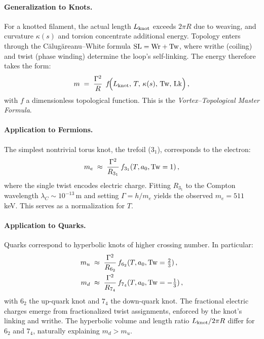 \documentclass[12pt]{article}
\begin{document}
\paragraph{Generalization to Knots.}
For a knotted filament, the actual length $L_{\rm knot}$ exceeds $2\pi R$ due to weaving, and curvature $\kappa(s)$ and torsion concentrate additional energy. Topology enters through the Călugăreanu–White formula ${\rm SL}={\rm Wr}+{\rm Tw}$, where writhe (coiling) and twist (phase winding) determine the loop’s self-linking. The energy therefore takes the form:
\begin{equation}
m \;=\; \frac{\Gamma^2}{R}\;\,f\!\Big(L_{\rm knot},\,T,\,\kappa(s),\,{\rm Tw},\,{\rm Lk}\Big)\,,
\label{eq:master}
\end{equation}
with $f$ a dimensionless topological function. This is the \emph{Vortex–Topological Master Formula}.

\paragraph{Application to Fermions.}
The simplest nontrivial torus knot, the trefoil ($3_1$), corresponds to the electron:
\begin{equation}
m_e \;\approx\; \frac{\Gamma^2}{R_{3_1}}\,f_{3_1}(T,a_0,{\rm Tw}=1)\,,
\end{equation}
where the single twist encodes electric charge. Fitting $R_{3_1}$ to the Compton wavelength $\lambda_C\sim 10^{-13}\,$m and setting $\Gamma = h/m_e$ yields the observed $m_e=511$ keV. This serves as a normalization for $T$.

\paragraph{Application to Quarks.}
Quarks correspond to hyperbolic knots of higher crossing number. In particular:
\begin{align}
m_u &\;\approx\; \frac{\Gamma^2}{R_{6_2}}\,f_{6_2}(T,a_0,{\rm Tw}=\tfrac{2}{3})\,, \\
m_d &\;\approx\; \frac{\Gamma^2}{R_{7_4}}\,f_{7_4}(T,a_0,{\rm Tw}=-\tfrac{1}{3})\,,
\end{align}
with $6_2$ the up-quark knot and $7_4$ the down-quark knot. The fractional electric charges emerge from fractionalized twist assignments, enforced by the knot’s linking and writhe. The hyperbolic volume and length ratio $L_{\rm knot}/2\pi R$ differ for $6_2$ and $7_4$, naturally explaining $m_d > m_u$.
\end{document}
